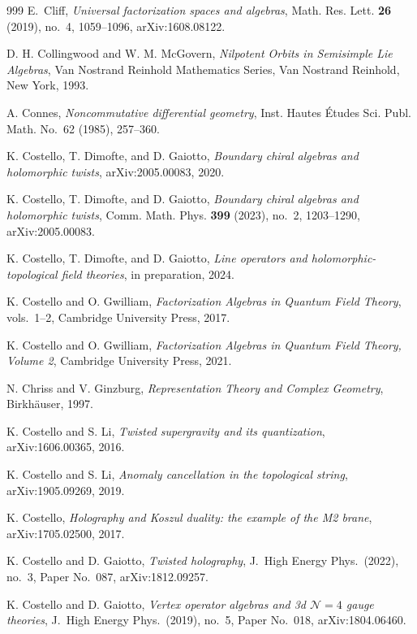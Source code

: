 \begin{thebibliography}{999}
E.~Cliff, \emph{Universal factorization spaces and algebras}, Math. Res. Lett. \textbf{26} (2019), no.~4, 1059--1096, arXiv:1608.08122.

D. H. Collingwood and W. M. McGovern, \emph{Nilpotent Orbits in Semisimple Lie Algebras}, Van Nostrand Reinhold Mathematics Series, Van Nostrand Reinhold, New York, 1993.

A. Connes, \emph{Noncommutative differential geometry}, Inst. Hautes \'Etudes Sci. Publ. Math. No.~62 (1985), 257--360.

K. Costello, T. Dimofte, and D. Gaiotto, \emph{Boundary chiral algebras and holomorphic twists}, arXiv:2005.00083, 2020.

K. Costello, T. Dimofte, and D. Gaiotto, \emph{Boundary chiral algebras and holomorphic twists}, Comm. Math. Phys. \textbf{399} (2023), no.~2, 1203--1290, arXiv:2005.00083.

K. Costello, T. Dimofte, and D. Gaiotto, \emph{Line operators and holomorphic-topological field theories}, in preparation, 2024.

K. Costello and O. Gwilliam, \emph{Factorization Algebras in Quantum Field Theory}, vols.~1--2, Cambridge University Press, 2017.

K. Costello and O. Gwilliam, \emph{Factorization Algebras in Quantum Field Theory, Volume 2}, Cambridge University Press, 2021.

N. Chriss and V. Ginzburg, \emph{Representation Theory and Complex Geometry}, Birkh\"auser, 1997.

K. Costello and S. Li, \emph{Twisted supergravity and its quantization}, arXiv:1606.00365, 2016.

K. Costello and S. Li, \emph{Anomaly cancellation in the topological string}, arXiv:1905.09269, 2019.

K. Costello, \emph{Holography and Koszul duality: the example of the M2 brane}, arXiv:1705.02500, 2017.

K. Costello and D. Gaiotto, \emph{Twisted holography}, J.\ High Energy Phys.\ (2022), no.~3, Paper No.~087, arXiv:1812.09257.

K. Costello and D. Gaiotto, \emph{Vertex operator algebras and 3d $\mathcal{N}=4$ gauge theories}, J.\ High Energy Phys.\ (2019), no.~5, Paper No.~018, arXiv:1804.06460.


\end{thebibliography}
